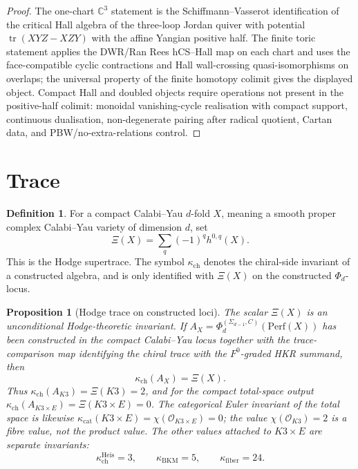 \documentclass[11pt]{amsart}
\providecommand{\bC}{\mathbb{C}}
\providecommand{\cO}{\mathcal{O}}
\providecommand{\Perf}{\mathrm{Perf}}
\newtheorem{proposition}[theorem]{Proposition}
\theoremstyle{definition}
\newtheorem{definition}[theorem]{Definition}
\theoremstyle{remark}
\begin{document}
\begin{proof}
The one-chart \(\bC^3\) statement is the Schiffmann--Vasserot
identification of the critical Hall algebra of the three-loop Jordan
quiver with potential \(\operatorname{tr}(XYZ-XZY)\) with the affine
Yangian positive half. The finite toric statement applies the
DWR/Ran Rees hCS--Hall map on each chart and uses the face-compatible
cyclic contractions and Hall wall-crossing quasi-isomorphisms on
overlaps; the universal property of the finite homotopy colimit gives
the displayed object. Compact Hall and doubled objects require operations
not present in the positive-half colimit: monoidal vanishing-cycle
realisation with compact support, continuous dualisation, non-degenerate
pairing after radical quotient, Cartan data, and PBW/no-extra-relations
control.
\end{proof}

\section{Trace}

\begin{definition}
For a compact Calabi--Yau \(d\)-fold \(X\), meaning a smooth proper complex
Calabi--Yau variety of dimension \(d\), set
\[
        \Xi(X)=\sum_q(-1)^q h^{0,q}(X).
\]
This is the Hodge supertrace. The symbol
\(\kappa_{\mathrm{ch}}\) denotes the chiral-side invariant of a constructed
algebra, and is only identified with \(\Xi(X)\) on the constructed
\(\Phi_d\)-locus.
\end{definition}

\begin{proposition}[Hodge trace on constructed loci]
The scalar \(\Xi(X)\) is an unconditional Hodge-theoretic invariant. If
\(A_X=\Phi_d^{(\Sigma_{d-1},C)}(\Perf(X))\) has been constructed in the
compact Calabi--Yau locus together with the trace-comparison map
identifying the chiral trace with the \(F^0\)-graded HKR summand, then
\[
        \kappa_{\mathrm{ch}}(A_X)=\Xi(X).
\]
Thus \(\kappa_{\mathrm{ch}}(A_{K3})=\Xi(K3)=2\), and for the compact
total-space output \(\kappa_{\mathrm{ch}}(A_{K3\times E})=\Xi(K3\times
E)=0\). The categorical Euler invariant of the total space is likewise
\(\kappa_{\mathrm{cat}}(K3\times E)=\chi(\cO_{K3\times E})=0\); the value
\(\chi(\cO_{K3})=2\) is a fibre value, not the product value. The other
values attached to \(K3\times E\) are separate invariants:
\[
        \kappa_{\mathrm{ch}}^{\mathrm{Heis}}=3,\qquad
        \kappa_{\mathrm{BKM}}=5,\qquad
        \kappa_{\mathrm{fiber}}=24 .
\]
\end{proposition}
\end{document}
